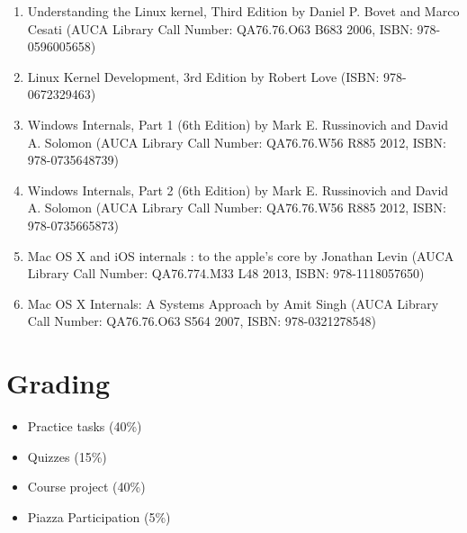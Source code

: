 \documentclass[12pt,a4paper,oneside]{article}
\begin{document}
            \begin{enumerate}
                \item Understanding the Linux kernel, Third Edition by Daniel P.
                Bovet and Marco Cesati (AUCA Library Call Number: QA76.76.O63
                B683 2006, ISBN: 978-0596005658)
                \item Linux Kernel Development, 3rd Edition by Robert Love
                (ISBN: 978-0672329463)
                \item Windows Internals, Part 1 (6th Edition) by Mark E.
                Russinovich and David A. Solomon (AUCA Library Call Number:
                QA76.76.W56 R885 2012, ISBN: 978-0735648739)
                \item Windows Internals, Part 2 (6th Edition) by Mark E.
                Russinovich and David A. Solomon (AUCA Library Call Number:
                QA76.76.W56 R885 2012, ISBN: 978-0735665873)
                \item Mac OS X and iOS internals : to the apple's core by
                Jonathan Levin (AUCA Library Call Number: QA76.774.M33 L48 2013,
                ISBN: 978-1118057650)
                \item Mac OS X Internals: A Systems Approach by Amit Singh (AUCA
                Library Call Number: QA76.76.O63 S564 2007, ISBN:
                978-0321278548)
            \end{enumerate}

    \section{Grading}

        \begin{itemize}
            \item Practice tasks (40\%)
            \item Quizzes (15\%)
            \item Course project (40\%)
            \item Piazza Participation (5\%)
        \end{itemize}
\end{document}
